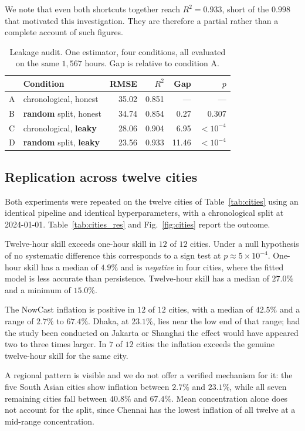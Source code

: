 \documentclass[conference,a4paper]{IEEEtran}
\begin{document}
We note that even both shortcuts together reach $R^2 = 0.933$, short of the
$0.998$ that motivated this investigation. They are therefore a partial rather
than a complete account of such figures.

\begin{table}[t]
\caption{Leakage audit. One estimator, four conditions, all evaluated on the
same $1{,}567$ hours. Gap is relative to condition A.}
\label{tab:leak}
\centering
\small
\begin{tabular}{@{}llrrrr@{}}
\toprule
 & Condition & RMSE & $R^2$ & Gap & $p$ \\
\midrule
A & chronological, honest & 35.02 & 0.851 & --- & --- \\
B & \textbf{random} split, honest & 34.74 & 0.854 & 0.27 & 0.307 \\
C & chronological, \textbf{leaky} & 28.06 & 0.904 & 6.95 & $<10^{-4}$ \\
D & \textbf{random} split, \textbf{leaky} & 23.56 & 0.933 & 11.46 & $<10^{-4}$ \\
\bottomrule
\end{tabular}
\end{table}

\subsection{Replication across twelve cities}
Both experiments were repeated on the twelve cities of Table~\ref{tab:cities}
using an identical pipeline and identical hyperparameters, with a chronological
split at 2024-01-01. Table~\ref{tab:cities_res} and Fig.~\ref{fig:cities} report
the outcome.

Twelve-hour skill exceeds one-hour skill in $12$ of $12$ cities. Under a null
hypothesis of no systematic difference this corresponds to a sign test at
$p \approx 5\times10^{-4}$. One-hour skill has a median of $4.9\%$ and is
\emph{negative} in four cities, where the fitted model is less accurate than
persistence. Twelve-hour skill has a median of $27.0\%$ and a minimum of
$15.0\%$.

The NowCast inflation is positive in $12$ of $12$ cities, with a median of
$42.5\%$ and a range of $2.7\%$ to $67.4\%$. Dhaka, at $23.1\%$, lies near the
low end of that range; had the study been conducted on Jakarta or Shanghai the
effect would have appeared two to three times larger. In $7$ of $12$ cities the
inflation exceeds the genuine twelve-hour skill for the same city.

A regional pattern is visible and we do not offer a verified mechanism for it:
the five South Asian cities show inflation between $2.7\%$ and $23.1\%$, while
all seven remaining cities fall between $40.8\%$ and $67.4\%$. Mean concentration
alone does not account for the split, since Chennai has the lowest inflation of
all twelve at a mid-range concentration.
\end{document}
